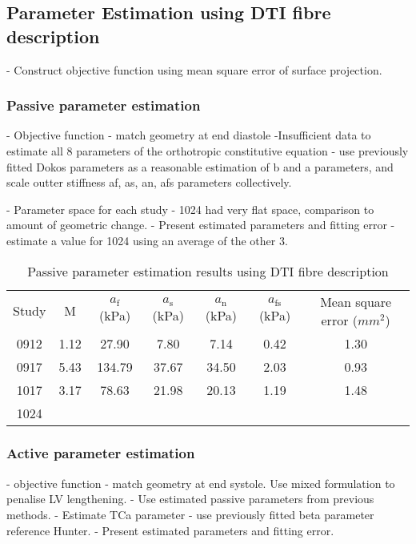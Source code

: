 \documentclass{llncs}
\begin{document}
\subsection{Parameter Estimation using DTI fibre description}

- Construct objective function using mean square error of surface projection. 
\subsubsection{Passive parameter estimation}
- Objective function - match geometry at end diastole
-Insufficient data to estimate all 8 parameters of the orthotropic constitutive equation - use previously fitted Dokos parameters as a reasonable estimation of b and a parameters, and scale outter stiffness {af, as, an, afs} parameters collectively. 

- Parameter space for each study - 1024 had very flat space, comparison to amount of geometric change. 
- Present estimated parameters and fitting error - estimate a value for 1024 using an average of the other 3.  

\begin{table}[H]
	\caption{Passive parameter estimation results using DTI fibre description}
	\begin{center}
		\renewcommand{\arraystretch}{1.2}
		\setlength\tabcolsep{8pt}
		\begin{tabular}{ccccccc}
		\hline\noalign{\smallskip}
		Study & M & $a_{\mathrm{f}}$ (kPa) & $a_{\mathrm{s}}$ (kPa) & $a_{\mathrm{n}}$ (kPa) & $a_{\mathrm{fs}}$ (kPa) & Mean square error ($mm^{2}$)\\
		\noalign{\smallskip}
		\hline
		\noalign{\smallskip}
		0912 & 1.12 & 27.90 & 7.80 & 7.14 & 0.42 & 1.30 \\
		\noaling{\smallskip}
		0917 & 5.43 & 134.79 & 37.67 & 34.50 & 2.03 & 0.93 \\ 
		\noaling{\smallskip}
		1017 & 3.17 & 78.63 & 21.98 & 20.13 & 1.19 & 1.48 \\ 
		\noaling{\smallskip}
		1024 &  & & & & & \\ 
		\hline
		\end{tabular}
	\end{center}
\end{table}

  
\subsubsection{Active parameter estimation}
- objective function - match geometry at end systole. Use mixed formulation to penalise LV lengthening.
- Use estimated passive parameters from previous methods. 
- Estimate TCa parameter - use previously fitted beta parameter reference Hunter. 
- Present estimated parameters and fitting error. 
\end{document}
